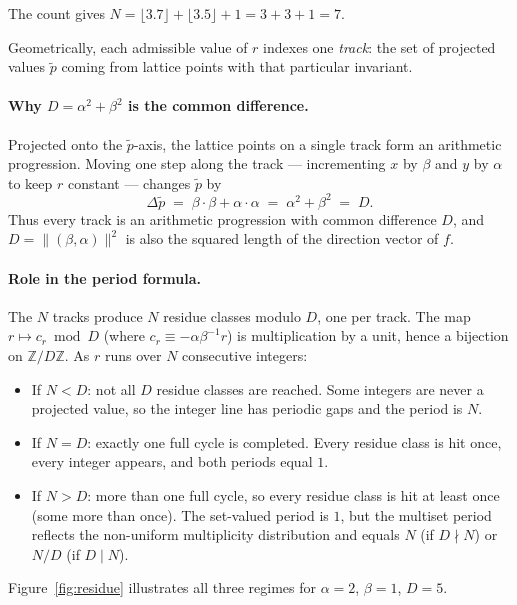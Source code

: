 \documentclass{amsart}
\theoremstyle{definition}
\theoremstyle{plain}
\theoremstyle{remark}
\begin{document}
\noindent
The count gives \(N = \lfloor 3.7\rfloor + \lfloor 3.5\rfloor + 1 = 3+3+1 = 7\).

Geometrically, each admissible value of \(r\) indexes one \emph{track}: the
set of projected values \(\tilde{p}\) coming from lattice points with that
particular invariant.

\paragraph{Why \(D = \alpha^2+\beta^2\) is the common difference.}
Projected onto the \(\tilde{p}\)-axis, the lattice points on a single track
form an arithmetic progression.  Moving one step along the track
--- incrementing \(x\) by \(\beta\) and \(y\) by \(\alpha\) to keep \(r\)
constant --- changes \(\tilde{p}\) by
\[
  \Delta\tilde{p}
  \;=\; \beta\cdot\beta + \alpha\cdot\alpha
  \;=\; \alpha^2+\beta^2 \;=\; D.
\]
Thus every track is an arithmetic progression with common difference \(D\),
and \(D = \|(\beta,\alpha)\|^2\) is also the squared length of the direction
vector of \(f\).

\paragraph{Role in the period formula.}
The \(N\) tracks produce \(N\) residue classes modulo \(D\), one per track.
The map \(r \mapsto c_r \bmod D\) (where \(c_r \equiv -\alpha\beta^{-1}r\)) is
multiplication by a unit, hence a bijection on \(\mathbb{Z}/D\mathbb{Z}\).
As \(r\) runs over \(N\) consecutive integers:
\begin{itemize}
  \item If \(N < D\): not all \(D\) residue classes are reached.  Some integers
        are never a projected value, so the integer line has periodic gaps
        and the period is \(N\).
  \item If \(N = D\): exactly one full cycle is completed.  Every residue class
        is hit once, every integer appears, and both periods equal \(1\).
  \item If \(N > D\): more than one full cycle, so every residue class is
        hit at least once (some more than once).  The set-valued period is
        \(1\), but the multiset period reflects the non-uniform multiplicity
        distribution and equals \(N\) (if \(D \nmid N\)) or \(N/D\)
        (if \(D \mid N\)).
\end{itemize}
Figure~\ref{fig:residue} illustrates all three regimes for
\(\alpha=2\), \(\beta=1\), \(D=5\).
\end{document}
